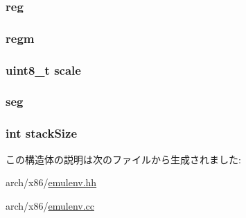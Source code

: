 \hypertarget{structX86ISA_1_1EmulEnv_ab3cfff93a9eaf4043816e6667f4f4b5c}{
\subsubsection[{reg}]{ {\bf reg}}}
\label{structX86ISA_1_1EmulEnv_ab3cfff93a9eaf4043816e6667f4f4b5c}
\hypertarget{structX86ISA_1_1EmulEnv_a23102d8465dd60d680f731af9a84f689}{
\subsubsection[{regm}]{ {\bf regm}}}
\label{structX86ISA_1_1EmulEnv_a23102d8465dd60d680f731af9a84f689}
\hypertarget{structX86ISA_1_1EmulEnv_a616c0a72f0e4af38b93c736773ac7210}{
\subsubsection[{scale}]{\setlength{\rightskip}{0pt plus 5cm}uint8\_\-t {\bf scale}}}
\label{structX86ISA_1_1EmulEnv_a616c0a72f0e4af38b93c736773ac7210}
\hypertarget{structX86ISA_1_1EmulEnv_af746478528438f57577dbfd5f772079e}{
\subsubsection[{seg}]{ {\bf seg}}}
\label{structX86ISA_1_1EmulEnv_af746478528438f57577dbfd5f772079e}
\hypertarget{structX86ISA_1_1EmulEnv_aa19ead659daf6b0a04ef9cd9ad3f1d8d}{
\subsubsection[{stackSize}]{\setlength{\rightskip}{0pt plus 5cm}int {\bf stackSize}}}
\label{structX86ISA_1_1EmulEnv_aa19ead659daf6b0a04ef9cd9ad3f1d8d}


この構造体の説明は次のファイルから生成されました:\begin{DoxyCompactItemize}
\item 
arch/x86/\hyperlink{emulenv_8hh}{emulenv.hh}\item 
arch/x86/\hyperlink{emulenv_8cc}{emulenv.cc}\end{DoxyCompactItemize}
